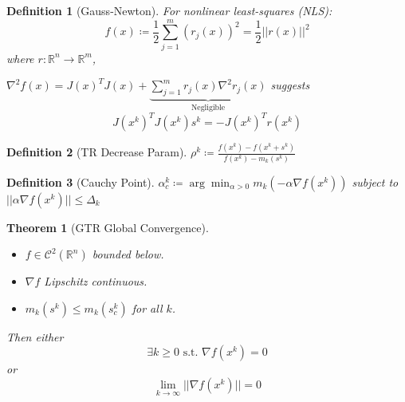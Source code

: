 \documentclass[a4paper]{article}
\newcommand{\R}{\mathbb{R}}
\newcommand{\C}{\mathcal{C}}
\newcommand{\st}{\text{ s.t. }}
\newcommand{\norm}[1]{\lvert \lvert #1 \rvert \rvert}
\newtheorem{theorem}{Theorem}
\newtheorem*{definition*}{Definition}
\begin{document}
\begin{definition*}[Gauss-Newton]
    For nonlinear least-squares (NLS):
    \begin{equation*}
        f(x) \coloneqq \frac{1}{2} \sum_{j=1}^m \left( r_j (x) \right)^2 = \frac{1}{2} \norm{r(x)}^2
    \end{equation*}
    where $r:\R^n \rightarrow \R^m$,

    $\nabla^{2} f (x) = J(x)^T J(x) + \underbrace{\sum_{j=1}^m r_j (x) \nabla^{2} r_j (x)}_{\text{Negligible}}$ suggests
    \begin{equation*}
        J \left( x^k \right)^T J\left( x^k \right) s^k = -J\left( x^k \right)^T r\left( x^k \right)
    \end{equation*}
\end{definition*}

\begin{definition*}[TR Decrease Param]
    $\rho^k \coloneqq \frac{f\left( x^k \right) - f\left( x^k + s^k \right)}{f\left( x^k \right) - m_k \left( s^k \right)}$
\end{definition*}

\begin{definition*}[Cauchy Point]
    $\alpha_c^k \coloneqq \arg \min_{\alpha > 0} m_{k} \left( -\alpha \nabla f \left( x^k \right) \right)$ subject to $\norm{\alpha \nabla f \left( x^k \right)} \leq \Delta_k$
\end{definition*}

\setcounter{theorem}{10}
\begin{theorem}[GTR Global Convergence]
    \phantom \\
    \begin{itemize}
        \item $f \in \C^2 \left( \R^n \right)$ bounded below.
        \item $\nabla f$ Lipschitz continuous.
        \item $m_k \left( s^k \right) \leq m_k \left( s_c^k \right)$ for all $k$.
    \end{itemize}
    Then either
    \begin{equation*}
        \exists k \geq 0 \st \nabla f \left( x^k \right) = 0
    \end{equation*}
    or
    \begin{equation*}
        \lim_{k \rightarrow \infty} \norm{\nabla f \left( x^k \right)} = 0
    \end{equation*}
\end{theorem}
\end{document}
